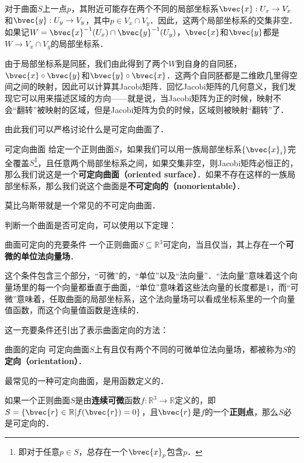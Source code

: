 

对于曲面$S$上一点$p$，其附近可能存在两个不同的局部坐标系$\bvec{x}:U_x\to V_x$和$\bvec{y}:U_y\to V_y$，其中$p\in V_x\cap V_y$．因此，这两个局部坐标系的交集非空．如果记$W=\bvec{x}^{-1}(U_x)\cap\bvec{y}^{-1}(U_y)$，$\bvec{x}$和$\bvec{y}$都是$W\to V_x\cap V_y$的局部坐标系．

由于局部坐标系是同胚，我们由此得到了两个$W$到自身的自同胚，$\bvec{x}\circ\bvec{y}$和$\bvec{y}\circ\bvec{x}$．这两个自同胚都是二维欧几里得空间之间的映射，因此可以计算其Jacobi矩阵．回忆Jacobi矩阵的几何意义，我们发现它可以用来描述区域的方向——就是说，当Jacobi矩阵为正的时候，映射不会“翻转”被映射的区域，但是Jacobi矩阵为负的时候，区域则被映射“翻转”了．

由此我们可以严格讨论什么是可定向曲面了．

\begin{definition}{可定向曲面}
给定一个正则曲面$S$，如果我们可以用一族局部坐标系$\{\bvec{x}_i\}$完全覆盖$S$\footnote{即对于任意$p\in S$，总存在一个$\bvec{x}_p$包含$p$．}，且任意两个局部坐标系之间，如果交集非空，则Jacobi矩阵必恒正的，那么我们说这是一个\textbf{可定向曲面（oriented surface）}．如果不存在这样的一族局部坐标系，那么我们说这个曲面是\textbf{不可定向的（nonorientable）}．
\end{definition}

莫比乌斯带就是一个常见的不可定向曲面．

判断一个曲面是否可定向，可以使用以下定理：

\begin{theorem}{曲面可定向的充要条件}
一个正则曲面$S\subseteq \mathbb{R}^3$可定向，当且仅当，其上存在一个\textbf{可微的单位法向量场}．
\end{theorem}

这个条件包含三个部分，“可微”的，“单位”以及“法向量”．“法向量”意味着这个向量场里的每一个向量都垂直于曲面，“单位”意味着这些法向量的长度都是$1$，而“可微”意味着，任取曲面的局部坐标系，这个法向量场可以看成坐标系里的一个向量值函数，而这个向量值函数是连续的．

这一充要条件还引出了表示曲面定向的方法：

\begin{definition}{曲面的定向}
可定向曲面$S$上有且仅有两个不同的可微单位法向量场，都被称为$S$的\textbf{定向（orientation）}．
\end{definition}

最常见的一种可定向曲面，是用函数定义的．

\begin{theorem}{}
如果一个正则曲面$S$是由\textbf{连续可微}函数$f:\mathbb{R}^3\to \mathbb{R}$定义的，即$S=\{\bvec{r}\in\mathbb{R}|f(\bvec{r})=0\}$，且$\bvec{r}$是$f$的一个\textbf{正则点}，那么$S$必是可定向的．
\end{theorem}







